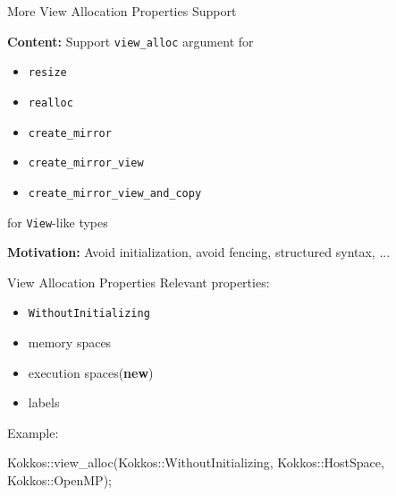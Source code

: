 

\begin{frame}[fragile]

  {\Huge More View Allocation Properties Support}

  \vspace{10pt}

  \textbf{Content:}
  Support \texttt{view\_alloc} argument for
  \begin{itemize}
    \item \texttt{resize}
    \item \texttt{realloc}
    \item \texttt{create\_mirror}
    \item \texttt{create\_mirror\_view}
    \item \texttt{create\_mirror\_view\_and\_copy}
  \end{itemize}
  for \texttt{View}-like types

  \vspace{10pt}

  \textbf{Motivation:}
  Avoid initialization, avoid fencing, structured syntax, ...

  \vspace{-20pt}

\end{frame}


\begin{frame}[fragile]{View Allocation Properties}
  Relevant properties:
  \begin{itemize}
   \item \texttt{WithoutInitializing}
   \item memory spaces
   \item execution spaces(\textbf {new})
   \item labels
  \end{itemize}

  Example:
  \begin{code}
   Kokkos::view_alloc(Kokkos::WithoutInitializing,
                      Kokkos::HostSpace{},
                      Kokkos::OpenMP{});
  \end{code}

  \end{frame}


